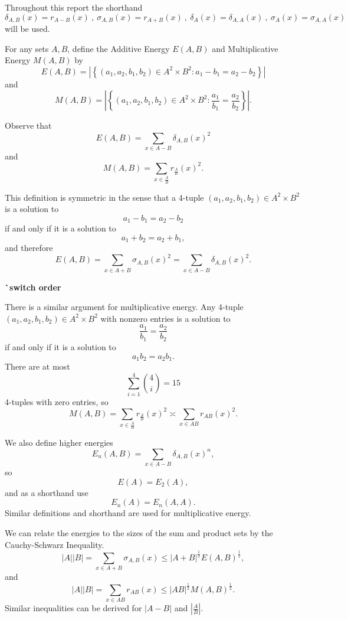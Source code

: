 \documentclass[12pt]{amsart}
\begin{document}
Throughout this report the shorthand
\[
    \delta_{A,B} (x) = r_{A - B} (x)~,~ \sigma _{A,B} (x) = r_{A + B} (x)~,~ \delta_{A} (x) = \delta_{A,A} (x) ~,~ \sigma_{A} (x) = \sigma _{A,A} (x)
\]
will be used.

For any sets \(A,B\), define the Additive Energy \(E(A,B)\) and Multiplicative Energy \(M(A,B)\) by
\[
    E(A,B) = \left\lvert \left\{ (a_1,a_2,b_1,b_2) \in A^{2} \times B^{2} : a_1 - b_1 = a_2 - b_2 \right\}  \right\rvert 
\]
and
\[
    M(A,B) = \left\lvert \left\{ (a_1,a_2,b_1,b_2)\in  A^{2} \times B^{2} : \frac{a_1}{b_1}  = \frac{a_2}{b_2}  \right\}  \right\rvert
.\]

Observe that
\[
    E(A,B) = \sum _{x \in A - B} \delta_{A,B} (x)^{2}
\]
and
\[
    M(A,B) = \sum _{x \in \frac{A}{B} } r_{\frac{A}{B} } (x)^{2} 
.\]

This definition is symmetric in the sense that a 4-tuple \((a_1,a_2,b_1,b_2)\in A^{2} \times B^{2}\) is a solution to
\[
    a_1 - b_1 = a_2 - b_2
\]
if and only if it is a solution to
\[
    a_1+b_2 = a_2+b_1
,\]
and therefore
\[
    E(A,B) = \sum _{x \in A + B} \sigma_{A,B}  (x)^{2} = \sum _{x \in A - B} \delta_{A,B}  (x)^{2}
.\]

\textbf{^^ switch order}

There is a similar argument for multiplicative energy.
Any 4-tuple \((a_1,a_2,b_1,b_2) \in A^{2} \times B^{2}\) with nonzero entries is a solution to
\[
    \frac{a_1}{b_1} = \frac{a_2}{b_2}
\]
if and only if it is a solution to
\[
    a_1 b_2 = a_2 b_1
.\]
There are at most
\[
    \sum _{i = 1} ^{4} \binom{4}{i}  = 15
\]
4-tuples with zero entries, so
\[
    M(A,B) = \sum _{x \in \frac{A}{B} } r_{\frac{A}{B} } (x) ^{2} \asymp \sum _{x \in AB} r_{AB} (x)^{2}
.\]

We also define higher energies
\[
    E_{n} (A,B) = \sum _{x \in A-B} \delta_{A,B} (x)^{n}  
,\]
so
\[
    E(A) = E_{2} (A)
,\]
and as a shorthand use
\[
    E_{n} (A) = E_{n} (A,A)
.\]
Similar definitions and shorthand are used for multiplicative energy.

We can relate the energies to the sizes of the sum and product sets by the Cauchy-Schwarz Inequality.
\[
    \left\lvert A \right\rvert \left\lvert B \right\rvert = \sum _{x \in A + B} \sigma_{A,B}  (x) \leq \left\lvert A + B \right\rvert ^{\frac{1}{2} } E(A,B)^{\frac{1}{2} }
,\]
and
\[
    \left\lvert A \right\rvert \left\lvert B \right\rvert = \sum _{x \in AB} r_{AB} (x) \leq \left\lvert AB \right\rvert ^{\frac{1}{2} }M(A,B)^{\frac{1}{2} }
.\]
Similar inequalities can be derived for \(\left\lvert A-B \right\rvert \) and \(\left\lvert \frac{A}{B}  \right\rvert \).
\end{document}
